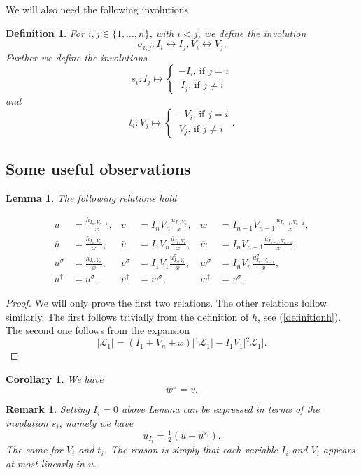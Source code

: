 \documentclass[11pt, a4paper]{amsart}
\newcommand{\eqst}[1]{\begin{equation*}#1\end{equation*}}
\theoremstyle{plain}
\newtheorem{lemma}{Lemma}[section]
\newtheorem{corollary}{Corollary}[section]
\newtheorem{remark}{Remark}[section]
\newtheorem{definition}{Definition}[section]
\numberwithin{equation}{section}
\begin{document}
\noindent We will also need the following involutions
\begin{definition}
\label{involutions}
For $i, j \in \{1,\dots,n\}$, with $i < j$, we define the involution \eqst{\sigma_{i,j}:I_i \leftrightarrow I_j, V_i \leftrightarrow V_j.}
Further we define the involutions \eqst{s_i : I_j \mapsto \left\{ \begin{array}{c}  -I_i\text{, if $j=i$} \\  \  I_j \text{, if $j\neq i$}  \end{array} \right.} and 
\eqst{t_i : V_j \mapsto \left\{ \begin{array}{c}  -V_i \text{, if $j=i$} \\  \  V_j \text{, if $j\neq i$}  \end{array} .\right.} 

\end{definition}


\subsection{Some useful observations}

\begin{lemma}
\label{rellist}
The following relations hold

\[
\begin{aligned}
u&= \tfrac{h_{I_n,V_{n-1}}}{x}, & v &= I_n V_n \tfrac{u_{I_1,V_n}}{ x} , & w &= I_{n-1} V_{n-1} \tfrac{u_{I_{n-1},V_{n-2}}}{ x},  \\ 
\overline u &= \tfrac{h_{I_n,V_n}}{x},  &\overline{v} &= I_1 V_n \tfrac{\overline u _{I_1,V_1}}{ x} , & \overline w &= I_n V_{n-1} \tfrac{\overline u _{I_{n-1},V_{n-1}}}{ x}, \\ 
u^\sigma &= \tfrac{h_{I_1,V_n}}{ x}  , &v^\sigma &= I_1 V_1 \tfrac{u^\sigma_{I_2,V_1}}x , & w^\sigma &= I_n V_n \tfrac{u^\sigma_{I_n,V_{n-1}}}x, \\ 
u^\dagger &= u^\sigma,  & {v^\dagger} &= w^\sigma, &  w^\dagger &= v^\sigma.
\end{aligned}
\]

\end{lemma}
\begin{proof}
We will only prove the first two relations. The other relations follow similarly. The first follows trivially from the definition of $h$, see (\ref{definitionh}). The second one follows from the expansion \eqst{\vert \mathcal L _1 \vert = (I_1+V_n+x) \vert {}^1 \mathcal L _1 \vert - I_1V_1 \vert {}^2 \mathcal L _1 \vert.}
\end{proof}
\begin{corollary}
\label{easycor}
We have \eqst{w^\sigma = v.}
\end{corollary}
\begin{remark}
Setting $I_i = 0$ above Lemma can be expressed in terms of the involution $s_i$, namely we have \eqst{u_{I_i} = \tfrac 1 2 (u+u^{s_i}).} The same for $V_i$ and $t_i$. The reason is simply that each variable $I_i$ and $V_i$ appears at most linearly in $u$.
\end{remark}
\end{document}

